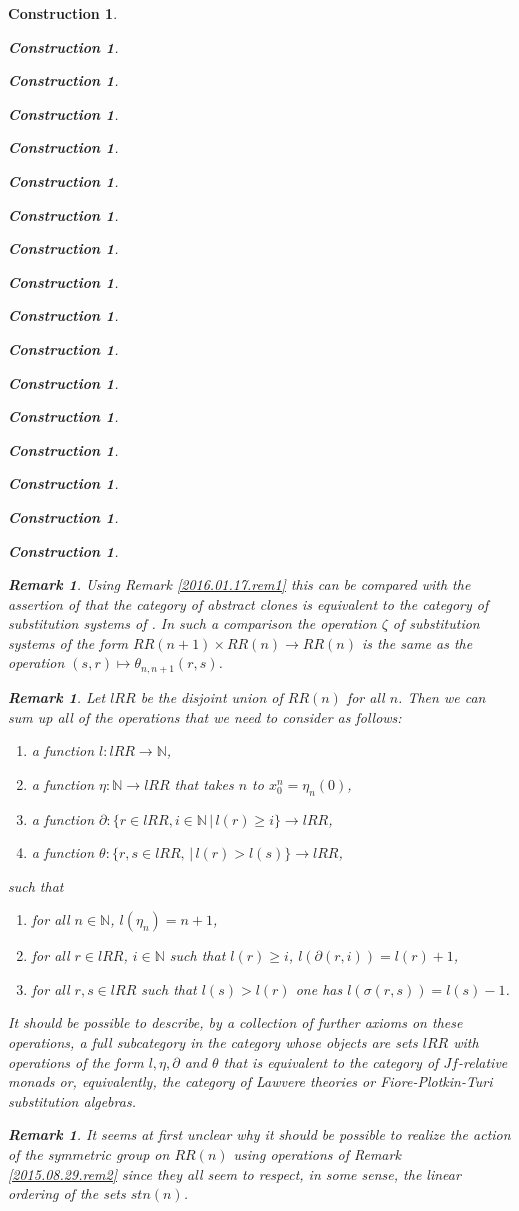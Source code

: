 \documentclass[12pt]{amsart}
\newtheorem{remark}[proposition]{Remark}
\numberwithin{proposition}{subsection}
\newtheorem{construction}[proposition]{Construction}
\newcommand{\llabel}[1]{\label{#1}}
\newcommand{\sr}{\rightarrow}
\newcommand{\nn}{{\mathbb N}}
\newcommand{\nat}{\nn}
\begin{document}
\begin{construction}
\begin{construction}
\begin{construction}
\begin{construction}
\begin{construction}
\begin{construction}
\begin{construction}
\begin{construction}
\begin{construction}
\begin{construction}
\begin{construction}
\begin{construction}
\begin{construction}
\begin{construction}
\begin{construction}
\begin{construction}
\begin{construction}
\begin{remark}
Using Remark \ref{2016.01.17.rem1} this can be compared with the assertion of
\cite[Theorem 3.3]{FPT} that the category of abstract clones is equivalent to
the category of substitution systems of \cite[Definition 3.1]{FPT}. In such a
comparison the operation $\zeta$ of substitution systems of the form
$RR(n+1)\times RR(n)\sr RR(n)$ is the same as the operation $(s,r)\mapsto
\theta_{n,n+1}(r,s)$.
\end{remark}
%
\begin{remark}\rm
\llabel{2015.08.29.rem1}
Let $lRR$ be the disjoint union of $RR(n)$ for all $n$. Then we can sum up all of the operations that we need to consider as follows: 
%
\begin{enumerate}
\item a function $l:lRR\sr\nat$,
\item a function $\eta:\nat\sr lRR$ that takes $n$ to $x^n_0=\eta_{n}(0)$,
\item a function $\partial:\{r\in lRR, i\in\nat\,|\, l(r)\ge i\}\sr lRR$,
\item a function $\theta:\{r,s\in lRR,\,|\,l(r)>l(s)\}\sr lRR$,
\end{enumerate}
%
such that
%
\begin{enumerate}
\item for all $n\in\nat$, $l(\eta_{n})=n+1$,
\item for all $r\in lRR$, $i\in\nat $ such that $l(r)\ge i$, $l(\partial(r,i))=l(r)+1$,
\item for all $r,s\in lRR$ such that $l(s)>l(r)$ one has $l(\sigma(r,s))=l(s)-1$.
\end{enumerate}
%
It should be possible to describe, by a collection of further axioms on these
operations, a full subcategory in the category whose objects are sets $lRR$
with operations of the form $l,\eta,\partial$ and $\theta$ that is equivalent
to the category of $Jf$-relative monads or, equivalently, the category of
Lawvere theories or Fiore-Plotkin-Turi substitution algebras.
\end{remark}
%
\begin{remark}\rm
\llabel{2015.08.29.rem1b} It seems at first unclear why it should be possible
to realize the action of the symmetric group on $RR(n)$ using operations of
Remark \ref{2015.08.29.rem2} since they all seem to respect, in some sense, the
linear ordering of the sets $stn(n)$.


\end{remark}
\end{construction}
\end{construction}
\end{construction}
\end{construction}
\end{construction}
\end{construction}
\end{construction}
\end{construction}
\end{construction}
\end{construction}
\end{construction}
\end{construction}
\end{construction}
\end{construction}
\end{construction}
\end{construction}
\end{construction}
\end{document}
